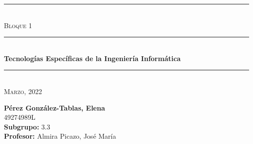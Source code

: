 \begin{titlepage}
	\begin{center}
		\rule{15cm}{0pt} \\
		[3cm]
		\textsc{\Large Bloque 1} \\
		\rule{15cm}{1pt} \\
		[0.25cm]
		\huge{\bfseries Tecnologías Específicas de la Ingeniería Informática} \\
		\rule{15cm}{1pt} \\
		[0.25cm]
		\textsc{\Large Marzo, 2022}\\
		[9cm]
	\end{center}
	\begin{flushright}
		\textbf{Pérez González-Tablas, Elena} \\
		[0.25cm]
		49274989L \\
		[0.25cm]
		\textbf{Subgrupo:} 3.3 \\
		[0.25cm]
		\textbf{Profesor:} Almira Picazo, José María\\
	\end{flushright}
\end{titlepage}
\newpage